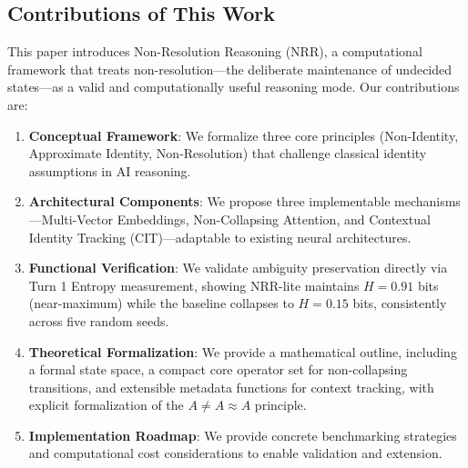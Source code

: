 \documentclass[11pt,a4paper]{article}
\newcommand{\AneqAapproxA}{A \neq A \approx A}
\begin{document}
\subsection{Contributions of This Work}

This paper introduces Non-Resolution Reasoning (NRR), a computational framework that treats non-resolution---the deliberate maintenance of undecided states---as a valid and computationally useful reasoning mode.
Our contributions are:

\begin{enumerate}
\item \textbf{Conceptual Framework}: We formalize three core principles (Non-Identity, Approximate Identity, Non-Resolution) that challenge classical identity assumptions in AI reasoning.
\item \textbf{Architectural Components}: We propose three implementable mechanisms---Multi-Vector Embeddings, Non-Collapsing Attention, and Contextual Identity Tracking (CIT)---adaptable to existing neural architectures.
\item \textbf{Functional Verification}: We validate ambiguity preservation directly via Turn 1 Entropy measurement, showing NRR-lite maintains $H = 0.91$ bits (near-maximum) while the baseline collapses to $H = 0.15$ bits, consistently across five random seeds.
\item \textbf{Theoretical Formalization}: We provide a mathematical outline, including a formal state space, a compact core operator set for non-collapsing transitions, and extensible metadata functions for context tracking, with explicit formalization of the $\AneqAapproxA$ principle.
\item \textbf{Implementation Roadmap}: We provide concrete benchmarking strategies and computational cost considerations to enable validation and extension.
\end{enumerate}
\end{document}
